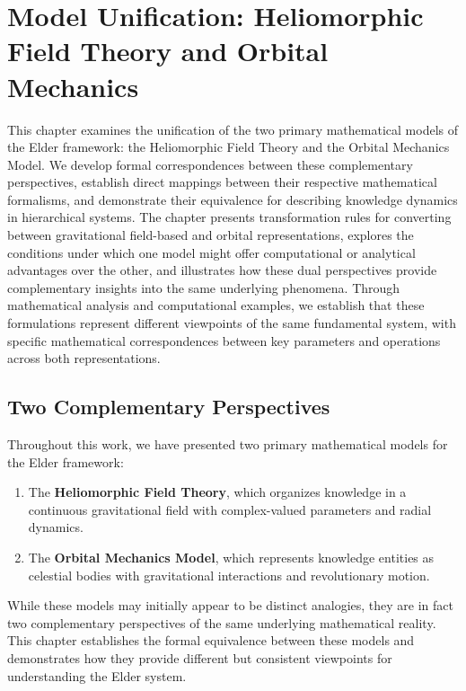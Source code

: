 \chapter{Model Unification: Heliomorphic Field Theory and Orbital Mechanics}

\begin{tcolorbox}[colback=PureBlue!5!white,colframe=PureBlue!75!black,title=Chapter Summary]
This chapter examines the unification of the two primary mathematical models of the Elder framework: the Heliomorphic Field Theory and the Orbital Mechanics Model. We develop formal correspondences between these complementary perspectives, establish direct mappings between their respective mathematical formalisms, and demonstrate their equivalence for describing knowledge dynamics in hierarchical systems. The chapter presents transformation rules for converting between gravitational field-based and orbital representations, explores the conditions under which one model might offer computational or analytical advantages over the other, and illustrates how these dual perspectives provide complementary insights into the same underlying phenomena. Through mathematical analysis and computational examples, we establish that these formulations represent different viewpoints of the same fundamental system, with specific mathematical correspondences between key parameters and operations across both representations.
\end{tcolorbox}

\section{Two Complementary Perspectives}

Throughout this work, we have presented two primary mathematical models for the Elder framework:

\begin{enumerate}
    \item The \textbf{Heliomorphic Field Theory}, which organizes knowledge in a continuous gravitational field with complex-valued parameters and radial dynamics.
    
    \item The \textbf{Orbital Mechanics Model}, which represents knowledge entities as celestial bodies with gravitational interactions and revolutionary motion.
\end{enumerate}

While these models may initially appear to be distinct analogies, they are in fact two complementary perspectives of the same underlying mathematical reality. This chapter establishes the formal equivalence between these models and demonstrates how they provide different but consistent viewpoints for understanding the Elder system.


